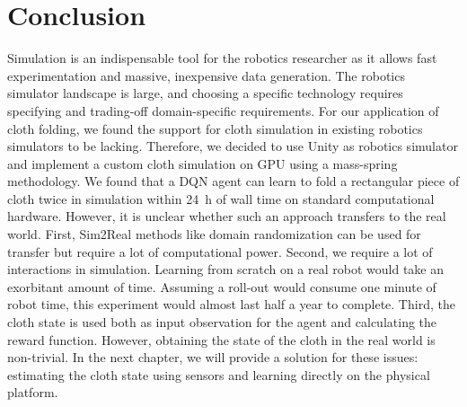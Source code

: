 \documentclass[\home/main.tex]{subfiles}
\begin{document}
\section{Conclusion}
Simulation is an indispensable tool for the robotics researcher as it allows fast experimentation and massive, inexpensive data generation. The robotics simulator landscape is large, and choosing a specific technology requires specifying and trading-off domain-specific requirements. For our application of cloth folding, we found the support for cloth simulation in existing robotics simulators to be lacking. Therefore, we decided to use Unity as robotics simulator and implement a custom cloth simulation on GPU using a mass-spring methodology. We found that a \gls{DQN} agent can learn to fold a rectangular piece of cloth twice in simulation within \qty{24}{\hour} of wall time on standard computational hardware. However, it is unclear whether such an approach transfers to the real world.
First, Sim2Real methods like domain randomization can be used for transfer but require a lot of computational power.
Second, we require a lot of interactions in simulation. Learning from scratch on a real robot would take an exorbitant amount of time. Assuming a roll-out would consume one minute of robot time, this experiment would almost last half a year to complete.
Third, the cloth state is used both as input observation for the agent and calculating the reward function. However, obtaining the state of the cloth in the real world is non-trivial.
In the next chapter, we will provide a solution for these issues: estimating the cloth state using sensors and learning directly on the physical platform.
\end{document}
